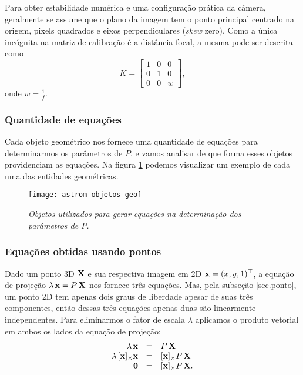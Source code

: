 Para obter estabilidade numérica e uma configuração prática da câmera, geralmente se assume que o plano da imagem tem o ponto principal centrado na origem, pixels quadrados e eixos perpendiculares ({\it skew} zero). Como a única incógnita na matriz de calibração é a distância focal, a mesma pode ser descrita como
\begin{equation}\label{eq.astrom-K}
K=
\begin{bmatrix}
1&0&0\\
0&1&0\\
0&0&w
\end{bmatrix},
\end{equation}
onde $w=\frac{1}{f}$.

\subsubsection*{Quantidade de equações}

Cada objeto geométrico nos fornece uma quantidade de equações para determinarmos os parâmetros de $P$, e vamos analisar de que forma esses objetos providenciam as equações. Na figura \ref{fig.astrom-objetos-geo} podemos visualizar um exemplo de cada uma das entidades geométricas.

\begin{figure}[!htb]
\centering
\texttt{[image: astrom-objetos-geo]}
\caption{{\it Objetos utilizados para gerar equações na determinação dos parâmetros de $P$.}}
\label{fig.astrom-objetos-geo}
\end{figure}

\subsubsection*{Equações obtidas usando pontos}

Dado um ponto 3D $\mathbf{X}$ e sua respectiva imagem em 2D $\mathbf{x}=(x,y,1)^\top$, a equação de projeção $\lambda\,\mathbf{x}=P\,\mathbf{X}$ nos fornece três equações. Mas, pela subseção \ref{sec.ponto}, um ponto 2D tem apenas dois graus de liberdade apesar de suas três componentes, então dessas três equações apenas duas são linearmente independentes. Para eliminarmos o fator de escala $\lambda$ aplicamos o produto vetorial em ambos os lados da equação de projeção:
\begin{equation}\label{eq.astrom-pontos}
\begin{array}{rcl}
\lambda\,\mathbf{x}&=&P\,\mathbf{X}\\
\lambda\,[\mathbf{x}]_\times\mathbf{x}&=&[\mathbf{x}]_\times P\,\mathbf{X}\\
{\bf 0}&=&[\mathbf{x}]_\times P\,\mathbf{X}.
\end{array}
\end{equation}

